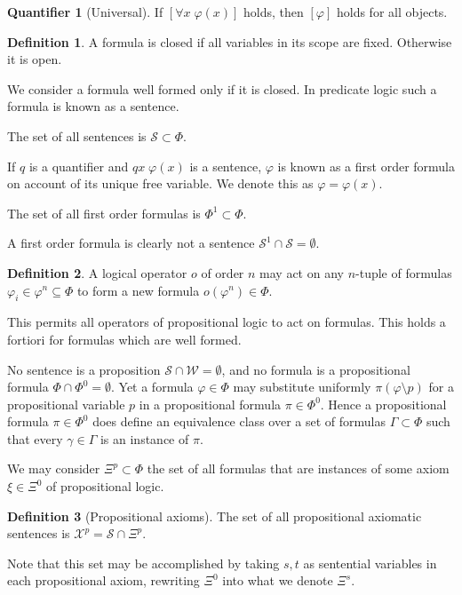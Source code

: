 \documentclass{amsbook}
\newcommand{\wffs}{\mathcal W}
\newcommand{\univ}[1]{\mathord\forall#1\;}
\theoremstyle{definition}
\newtheorem{quant}{Quantifier}[chapter]
\newtheorem{dfn}{Definition}[section]
\begin{document}
\begin{quant}[Universal]
    If $\left[\univ x \varphi(x)\right]$ holds, then $[\varphi]$ holds for all objects.
\end{quant}

\begin{dfn}
    A formula is closed if all variables in its scope are fixed. Otherwise it is open.

    We consider a formula well formed only if it is closed. In predicate logic such a formula is known as a sentence.

    The set of all sentences is $\mathcal S \subset \Phi$.

    If $q$ is a quantifier and $qx\;\varphi(x)$ is a sentence, $\varphi$ is known as a first order formula on account of its unique free variable. We denote this as $\varphi = \varphi(x)$.

    The set of all first order formulas is $\Phi^1 \subset \Phi$.
\end{dfn}

A first order formula is clearly not a sentence $\mathcal S^1 \cap \mathcal S = \emptyset$.

\begin{dfn}
    A logical operator $o$ of order $n$ may act on any $n$-tuple of formulas $\varphi_i \in \varphi^n \subseteq \Phi$ to form a new formula $o(\varphi^n) \in \Phi$.
\end{dfn}

This permits all operators of propositional logic to act on formulas. This holds a fortiori for formulas which are well formed.

No sentence is a proposition $\mathcal S \cap \wffs = \emptyset$, and no formula is a propositional formula $\Phi \cap \Phi^0 = \emptyset$. Yet a formula $\varphi \in \Phi$ may substitute uniformly $\pi(\varphi \setminus p)$ for a propositional variable $p$ in a propositional formula $\pi \in \Phi^0$. Hence a propositional formula $\pi \in \Phi^0$ does define an equivalence class over a set of formulas $\varGamma \subset \Phi$ such that every $\gamma \in \varGamma$ is an instance of $\pi$.

We may consider $\Xi^p \subset \Phi$ the set of all formulas that are instances of some axiom $\xi \in \Xi^0$ of propositional logic.

\begin{dfn}[Propositional axioms]
    The set of all propositional axiomatic sentences is $\mathcal X^p = \mathcal S \cap \Xi^p$.

    Note that this set may be accomplished by taking $s, t$ as sentential variables in each propositional axiom, rewriting $\Xi^0$ into what we denote $\Xi^s$.
\end{dfn}
\end{document}
